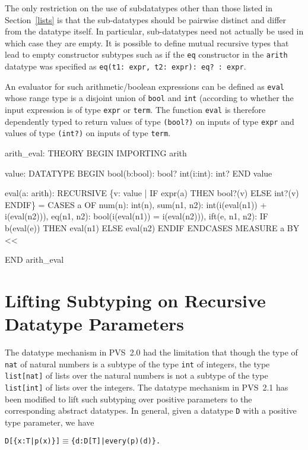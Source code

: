 \documentclass[11pt,twoside]{book}
\begin{document}
The only restriction on the use of subdatatypes other than those listed in
Section~\ref{lists} is that the sub-datatypes should be pairwise distinct
and differ from the datatype itself\@.  In particular, sub-datatypes need
not actually be used in which case they are empty.  It is possible to
define mutual recursive types that lead to empty constructor subtypes
such as if the \texttt{eq} constructor in the \texttt{arith} datatype was
specified as \texttt{eq(t1:\ expr, t2:\ expr):\ eq?\ :\ expr}\@.  

An evaluator for such arithmetic/boolean expressions can be defined
as \texttt{eval} whose range type is a disjoint union of \texttt{bool} and \texttt{int} (according to whether the input expression is of type \texttt{expr} or
\texttt{term}.  The function \texttt{eval} is therefore dependently typed
to return values of type \texttt{(bool?)} on  inputs of type \texttt{expr}
and values of type \texttt{(int?)} on inputs of type \texttt{term}\@. 
\begin{session*}\label{aritheval}
arith_eval: THEORY
 BEGIN
  IMPORTING arith

  value: DATATYPE
   BEGIN
    bool(b:bool): bool?
    int(i:int): int?
   END value

  eval(a: arith): RECURSIVE
         \{v: value | IF expr(a) THEN bool?(v) ELSE int?(v) ENDIF\} =
   CASES a OF
    num(n):       int(n),
    sum(n1, n2):  int(i(eval(n1)) + i(eval(n2))),
    eq(n1, n2):   bool(i(eval(n1)) = i(eval(n2))),
    ift(e, n1, n2): IF b(eval(e)) THEN eval(n1) ELSE eval(n2) ENDIF    
   ENDCASES
   MEASURE a BY <<

 END arith_eval
\end{session*}

\chapter{Lifting Subtyping on Recursive Datatype Parameters}\label{lifting}

The datatype mechanism in PVS~2.0 had the limitation that though the type
of \texttt{nat} of natural numbers is a subtype of the type \texttt{int} of
integers, the type \texttt{list[nat]} of lists over the
natural numbers is not a subtype of the type \texttt{list[int]} of
lists over the integers.  The datatype mechanism in PVS~2.1 has
been modified to lift such subtyping over positive parameters to the
corresponding abstract datatypes.    In general, given a datatype \texttt{D} with
a positive type parameter, we have
\begin{alltt}
  D[\{x: T | p(x)\}] \(\equiv\) \{d: D[T] | every(p)(d)\}.
\end{alltt}
\end{document}
